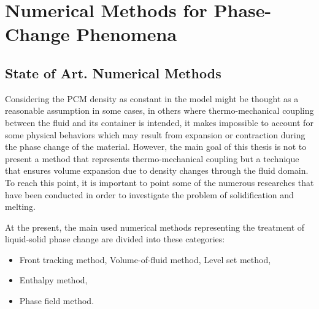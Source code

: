 
\chapter{Numerical Methods for Phase-Change Phenomena} %

\label{Chapter2} %


\section{State of Art. Numerical Methods} %
Considering the PCM density as constant in the model might be thought as a reasonable assumption in some cases, in others where thermo-mechanical coupling between the fluid and its container is intended, it makes impossible to account for some physical behaviors which may result from expansion or contraction during the phase change of the material. However, the main goal of this thesis is not to present a method that represents thermo-mechanical coupling but a technique that ensures volume expansion due to density changes through the fluid domain.
To reach this point, it is important to point some of the numerous researches that have been conducted in order to investigate the problem of solidification and melting. 
\newline

At the present, the main used numerical methods representing the treatment of liquid-solid phase change are divided into these categories:
\begin{itemize}
	\item Front tracking method,
	\subitem Volume-of-fluid method,
	\subitem Level set method,
	\item Enthalpy method,
	\item Phase field method.
\end{itemize}
